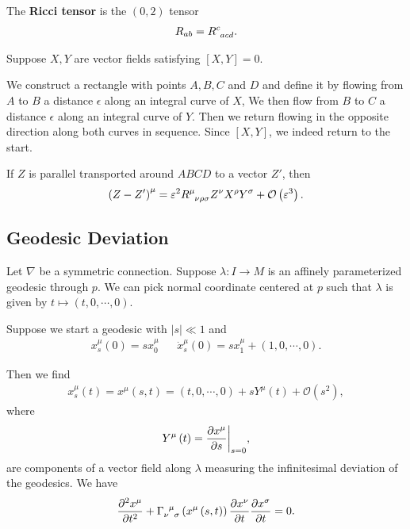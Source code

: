 \begin{definition}
    The \textbf{Ricci tensor} is the $\left( 0,2 \right)$ tensor
    \begin{align}
        R_{ab} = \tensor{R}{^{c}_{acd}}
    .\end{align}
\end{definition}

Suppose $X,Y$ are vector fields satisfying $\left[ X, Y \right] = 0$.

We construct a rectangle with points $A,B,C$ and $D$ and define it by flowing from $A$ to $B$ a distance $\epsilon$ along an integral curve of $X$, We then flow from $B$ to $C$ a distance $\epsilon$ along an integral curve of $Y$. Then we return flowing in the opposite direction along both curves in sequence. Since $\left[ X, Y \right] $, we indeed return to the start.

\begin{claim}
    If $Z$ is parallel transported around $ABCD$ to a vector $Z'$, then
    \begin{align}
        \left( Z-Z' \right)^{\mu} = \epsilon^2 \tensor{R}{^{\mu}_{\nu \rho \sigma}} Z^{\nu} X^{\rho} Y^{\sigma} + \mathcal{O}\left( \epsilon^3 \right) 
    .\end{align}
\end{claim}

\subsection{Geodesic Deviation}

Let $\nabla$ be a symmetric connection. Suppose $\lambda : I \to M$ is an affinely parameterized geodesic through $p$. We can pick normal coordinate centered at $p$ such that $\lambda$ is given by $t \mapsto \left( t,0,\cdots,0 \right) $.

Suppose we start a geodesic with $\left| s \right| \ll 1$ and
\begin{align}
    x_s^{\mu}\left( 0 \right)  = s x_0^{\mu} && \dot{x}_s^{\mu}\left( 0 \right) = s x_1^{\mu} + \left( 1, 0,\cdots,0 \right) 
.\end{align}

Then we find
\begin{align}
    x_s^{\mu}\left( t \right) = x^{\mu}\left( s,t \right) = \left( t,0,\cdots,0 \right) + s Y^{\mu}\left( t \right) + \mathcal{O}\left( s^2 \right) 
,\end{align}
where
\begin{align}
    Y^{\mu}\left( t \right) = \pdv{x^{\mu}}{s} \bigg|_{s=0}
,\end{align}
are components of a vector field along $\lambda$ measuring the infinitesimal deviation of the geodesics. We have
\begin{align}
    \pdv[2]{x^{\mu}}{t} + \tensor{\Gamma}{_{\nu}^{\mu}_{\sigma}}\left( x^{\mu}\left( s,t \right)  \right)  \pdv{x^{\nu}}{t} \pdv{x^{\sigma}}{t} = 0
.\end{align}

